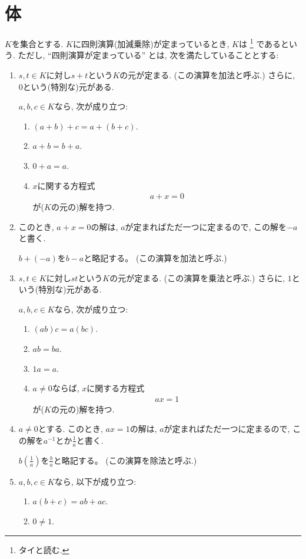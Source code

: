 \section{体}
$K$を集合とする.
$K$に四則演算(加減乗除)が定まっているとき,
$K$は
\footnote{タイと読む.}
であるという.
ただし,
``四則演算が定まっている''
とは, 次を満たしていることとする:
\begin{enumerate}
\item
  $s,t\in K$に対し$s+t$という$K$の元が定まる.
  (この演算を加法と呼ぶ.)
  さらに, $0$という(特別な)元がある.

  $a,b,c\in K$なら, 次が成り立つ:
  \begin{enumerate}
  \item
    $(a+b)+c=a+(b+c)$.
  \item
    $a+b=b+a$.
  \item
    $0+a=a$.
  \item
    $x$に関する方程式
    \begin{align*}
      a+x=0
    \end{align*}
    が($K$の元の)解を持つ.
  \end{enumerate}
\item
  このとき, $a+x=0$の解は,
  $a$が定まればただ一つに定まるので,
  この解を$-a$と書く.

  $b+(-a)$を$b-a$と略記する。
  (この演算を加法と呼ぶ.)

\item
  $s,t\in K$に対し$st$という$K$の元が定まる.
  (この演算を乗法と呼ぶ.)
  さらに, $1$という(特別な)元がある.

  $a,b,c\in K$なら, 次が成り立つ:
  \begin{enumerate}
  \item
    $(ab)c=a(bc)$.
  \item
    $ab=ba$.
  \item
    $1a=a$.
  \item
    $a\neq 0$ならば,
    $x$に関する方程式
    \begin{align*}
      ax=1
    \end{align*}
    が($K$の元の)解を持つ.
  \end{enumerate}

\item
  $a\neq 0$とする.
  このとき, $ax=1$の解は,
  $a$が定まればただ一つに定まるので,
  この解を$a^{-1}$とか$\frac{1}{a}$と書く.

  $b(\frac{1}{a})$を$\frac{b}{a}$と略記する。
  (この演算を除法と呼ぶ.)

\item
  $a,b,c\in K$なら, 以下が成り立つ:
  \begin{enumerate}
  \item $a(b+c)=ab+ac$.
  \item $0\neq 1$.
  \end{enumerate}
\end{enumerate}

